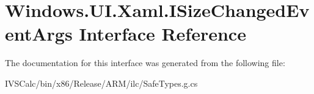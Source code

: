\hypertarget{interface_windows_1_1_u_i_1_1_xaml_1_1_i_size_changed_event_args}{}\section{Windows.\+U\+I.\+Xaml.\+I\+Size\+Changed\+Event\+Args Interface Reference}
\label{interface_windows_1_1_u_i_1_1_xaml_1_1_i_size_changed_event_args}


The documentation for this interface was generated from the following file\+:\begin{DoxyCompactItemize}
\item 
I\+V\+S\+Calc/bin/x86/\+Release/\+A\+R\+M/ilc/Safe\+Types.\+g.\+cs\end{DoxyCompactItemize}
